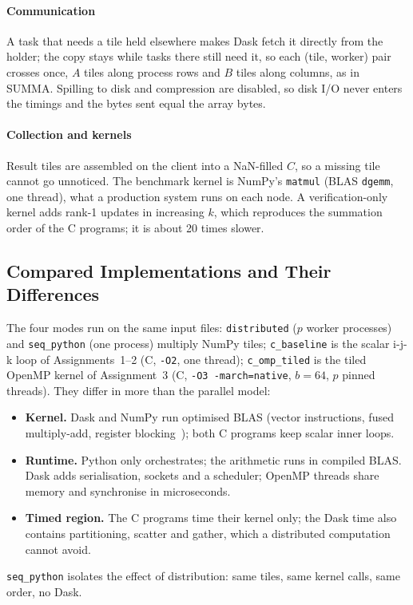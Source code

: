 \documentclass[conference,a4paper]{IEEEtran}
\newcommand{\code}[1]{\texttt{#1}}
\newcommand{\dist}{\code{distributed}}
\newcommand{\seqpy}{\code{seq\_python}}
\newcommand{\cseq}{\code{c\_baseline}}
\newcommand{\comp}{\code{c\_omp\_tiled}}
\begin{document}
\paragraph{Communication} A task that needs a tile held elsewhere makes Dask
fetch it directly from the holder; the copy stays while tasks there still need
it, so each (tile, worker) pair crosses once, $A$ tiles along process rows and
$B$ tiles along columns, as in SUMMA. Spilling to disk and compression are
disabled, so disk I/O never enters the timings and the bytes sent equal the
array bytes.

\paragraph{Collection and kernels} Result tiles are assembled on the client
into a NaN-filled $C$, so a missing tile cannot go unnoticed. The benchmark
kernel is NumPy's \code{matmul} (BLAS \code{dgemm}, one thread), what a
production system runs on each node. A verification-only kernel adds rank-1
updates in increasing $k$, which reproduces the summation order of the C
programs; it is about 20 times slower.

\subsection{Compared Implementations and Their Differences}
\label{sec:baselines}
The four modes run on the same input files: \dist{} ($p$ worker processes)
and \seqpy{} (one process) multiply NumPy tiles; \cseq{} is the scalar i-j-k
loop of Assignments~1--2 (C, \code{-O2}, one thread); \comp{} is the tiled
OpenMP kernel of Assignment~3 (C, \code{-O3 -march=native}, $b = 64$, $p$
pinned threads). They differ in more than the parallel model:
\begin{itemize}[itemsep=1pt]
  \item \textbf{Kernel.} Dask and NumPy run optimised BLAS (vector
        instructions, fused multiply-add, register blocking~\cite{goto2008});
        both C programs keep scalar inner loops.
  \item \textbf{Runtime.} Python only orchestrates; the arithmetic runs in
        compiled BLAS. Dask adds serialisation, sockets and a scheduler; OpenMP
        threads share memory and synchronise in microseconds.
  \item \textbf{Timed region.} The C programs time their kernel only; the Dask
        time also contains partitioning, scatter and gather, which a
        distributed computation cannot avoid.
\end{itemize}
\seqpy{} isolates the effect of distribution: same tiles, same kernel calls,
same order, no Dask.
\end{document}
